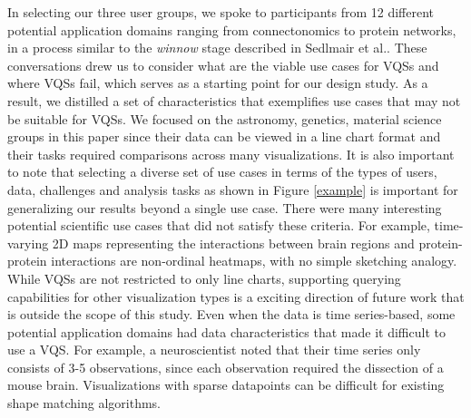 { 
\npar In selecting our three user groups, we spoke to participants from 12 different potential application domains ranging from connectonomics to protein networks, in a process similar to the \textit{winnow} stage described in Sedlmair et al.\cite{Sedlmair2012}. These conversations drew us to consider what are the viable use cases for VQSs and where VQSs fail, which serves as a starting point for our design study. As a result, we distilled a set of characteristics that exemplifies use cases that may not be suitable for VQSs. We focused on the astronomy, genetics, material science groups in this paper since their data can be viewed in a line chart format and their tasks required comparisons across many visualizations. It is also important to note that selecting a diverse set of use cases in terms of the types of users, data, challenges and analysis tasks as shown in Figure \ref{example} is important for generalizing our results beyond a single use case.
\npar There were many interesting potential scientific use cases that did not satisfy these criteria. For example, time-varying 2D maps representing the interactions between brain regions and protein-protein interactions are non-ordinal heatmaps, with no simple sketching analogy. While VQSs are not restricted to only line charts, supporting querying capabilities for other visualization types is a exciting direction of future work that is outside the scope of this study. Even when the data is time series-based, some potential application domains had data characteristics that made it difficult to use a VQS. For example, a neuroscientist noted that their time series only consists of 3-5  observations, since each observation required the dissection of a mouse brain. Visualizations with sparse datapoints can be difficult for existing shape matching algorithms.  

}
